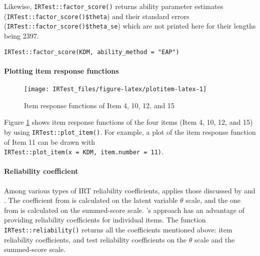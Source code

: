 Likewise, \texttt{IRTest::factor\_score()} returns ability parameter estimates
(\texttt{IRTest::factor\_score()\$theta}) and their standard errors
(\texttt{IRTest::factor\_score()\$theta\_se}) which are not printed here for their lengths being 2397.

\begin{verbatim}
IRTest::factor_score(KDM, ability_method = "EAP")
\end{verbatim}

\hypertarget{plotting-item-response-functions}{%
\paragraph{Plotting item response functions}\label{plotting-item-response-functions}}

\begin{figure}[H]

{\centering \texttt{[image: IRTest\_files/figure-latex/plotitem-latex-1]} 

}

\caption{Item response functions of Item 4, 10, 12, and 15}\label{fig:plotitem-latex}
\end{figure}

Figure
\ref{fig:plotitem-latex}
shows item response functions of the four items (Item 4, 10, 12, and 15) by using \texttt{IRTest::plot\_item()}.
For example, a plot of the item response function of Item 11 can be drawn with
\texttt{IRTest::plot\_item(x\ =\ KDM,\ item.number\ =\ 11)}.

\hypertarget{reliability-coefficient}{%
\paragraph{Reliability coefficient}\label{reliability-coefficient}}

Among various types of IRT reliability coefficients, 
applies those discussed by \citet{Green:1984} and \citet{May+Nicewander:1994}. The
coefficient from \citet{Green:1984} is calculated on the latent variable
\(\theta\) scale, and the one from \citet{May+Nicewander:1994} is calculated on
the summed-score scale. \citet{May+Nicewander:1994}'s approach has an advantage
of providing reliability coefficients for individual items. The
function \texttt{IRTest::reliability()} returns all the coefficients mentioned
above: item reliability coefficients, and test reliability coefficients
on the \(\theta\) scale and the summed-score scale.

